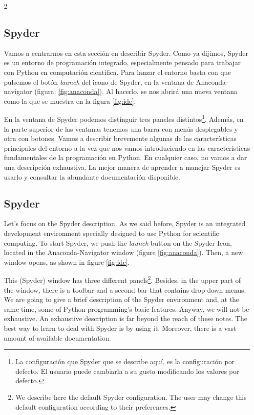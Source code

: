 \begin{paracol}{2}
\subsection{Spyder}
Vamos a centrarnos en esta sección en describir Spyder. Como ya dijimos, Spyder es un entorno de programación integrado, especialmente pensado para trabajar con Python en computación científica. Para lanzar el entorno basta con que pulsemos el botón \emph{launch} del icono de Spyder, en la ventana de Anaconda-navigator (figura: \ref{fig:anaconda}). Al hacerlo, se nos abrirá una nueva ventana como la que se muestra en la figura \ref{fig:ide}.

En la ventana de Spyder podemos distinguir tres paneles distintos\footnote{La configuración que Spyder que se describe  aquí, es la configuración por defecto. El usuario puede cambiarla a su gusto modificando los valores por defecto.}. Además, en la  parte superior de las ventanas tenemos una barra con menús desplegables y otra con botones. Vamos a describir brevemente algunas de las características principales del entorno a la vez que nos vamos introduciendo en las características fundamentales de la programación en Python. En cualquier caso, no vamos a dar una descripción exhaustiva. La mejor manera de aprender a manejar Spyder es usarlo y consultar la abundante documentación disponible.
\switchcolumn

\subsection{Spyder}
Let's focus on the Spyder description. As we said before, Spyder is an integrated development environment specially designed to use Python for scientific computing. To start Spyder, we push the \emph{launch} button on the Spyder Icon, located in the Anaconda-Navigator window (figure \ref{fig:anaconda}). Then, a new window opens, as shown in figure \ref{fig:ide}.

This (Spyder) window has three different panels\footnote{We describe here the default Spyder configuration. The user may change this default configuration according to their preferences.}. Besides, in the upper part of the window, there is a toolbar and a second bar that contains drop-down menus. We are going to give a brief description of the Spyder environment and, at the same time, some of Python programming's basic features. Anyway, we will not be exhaustive. An exhaustive description is far beyond the reach of these notes. The best way to learn to deal with Spyder is by using it. Moreover, there is a vast amount of available documentation.
\end{paracol}

